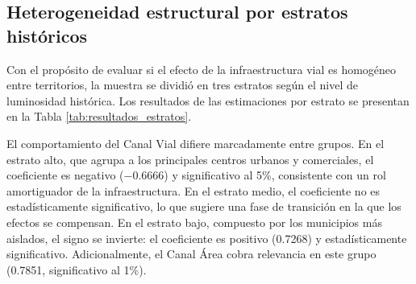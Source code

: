 \documentclass[
  spanish,
  12pt,
  letterpaper]{article}
\begin{document}
\subsection{Heterogeneidad estructural por estratos
históricos}\label{sec-estratos}

Con el propósito de evaluar si el efecto de la infraestructura vial es
homogéneo entre territorios, la muestra se dividió en tres estratos
según el nivel de luminosidad histórica. Los resultados de las
estimaciones por estrato se presentan en la Tabla
\ref{tab:resultados_estratos}.

El comportamiento del Canal Vial difiere marcadamente entre grupos. En
el estrato alto, que agrupa a los principales centros urbanos y
comerciales, el coeficiente es negativo (−0.6666) y significativo al
5\%, consistente con un rol amortiguador de la infraestructura. En el
estrato medio, el coeficiente no es estadísticamente significativo, lo
que sugiere una fase de transición en la que los efectos se compensan.
En el estrato bajo, compuesto por los municipios más aislados, el signo
se invierte: el coeficiente es positivo (0.7268) y estadísticamente
significativo. Adicionalmente, el Canal Área cobra relevancia en este
grupo (0.7851, significativo al 1\%).
\end{document}
